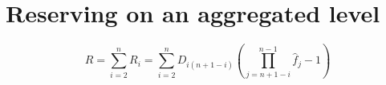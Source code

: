 \documentclass[11pt,a4paper,usenames]{article}
\begin{document}
\maketitle %
\section{Reserving on an aggregated level}
$$
R=\sum_{i=2}^{n}R_{i}=\sum_{i=2}^{n}D_{i(n+1-i)}\left(\prod_{j=n+1-i}^{n-1}\hat{f}_{j}-1\right)
\label{(a0)}
$$
\end{document}
